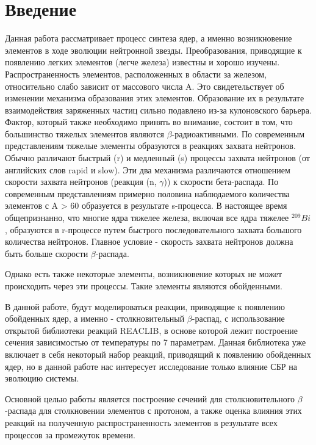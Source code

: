 \documentclass[14pt, a4paper]{article}
\numberwithin{figure}{section}
\numberwithin{equation}{section}
\begin{document}
\section*{\centering Введение}
Данная работа рассматривает процесс синтеза ядер, а именно возникновение элементов в ходе эволюции нейтронной звезды. Преобразования, приводящие к появлению легких элементов (легче железа) известны и хорошо изучены. Распространенность элементов, расположенных в области за железом, относительно слабо зависит от массового числа A. Это свидетельствует об изменении механизма образования этих элементов.  Образование их в результате взаимодействия заряженных частиц сильно подавлено из-за кулоновского барьера. Фактор, который также необходимо принять во внимание, состоит в том, что большинство тяжелых элементов являются $\beta$-радиоактивными. По современным представлениям тяжелые элементы образуются в реакциях захвата нейтронов. Обычно различают быстрый (r) и медленный (s) процессы захвата нейтронов (от английских слов rapid и slow). Эти два механизма различаются отношением скорости захвата нейтронов (реакция (n, $\gamma$)) к скорости бета-распада. По современным представлениям примерно половина наблюдаемого количества элементов с A > 60 образуется в результате s-процесса. В настоящее время общепризнанно, что многие ядра тяжелее железа, включая все ядра тяжелее $^{209}Bi$, образуются в r-процессе путем быстрого последовательного захвата большого количества нейтронов. Главное условие - скорость захвата нейтронов должна быть больше скорости $\beta$-распада. 

Однако есть также некоторые элементы, возникновение которых не может происходить через эти процессы. Такие элементы являются обойденными. 

В данной работе, будут моделироваться реакции, приводящие к появлению обойденных ядер, а именно - столкновительный $\beta$-распад, с использование открытой библиотеки реакций REACLIB, в основе которой лежит построение сечения зависимостью от температуры по 7 параметрам. Данная библиотека уже включает в себя некоторый набор реакций, приводящий к появлению обойденных ядер, но в данной работе нас интересует исследование только влияние СБР на эволюцию системы. 

Основной целью работы является построение сечений для столкновительного $\beta$-распада для столкновении элементов с протоном, 
а также оценка влияния этих реакций на полученную распространенность элементов в результате всех процессов за промежуток времени.
\end{document}
